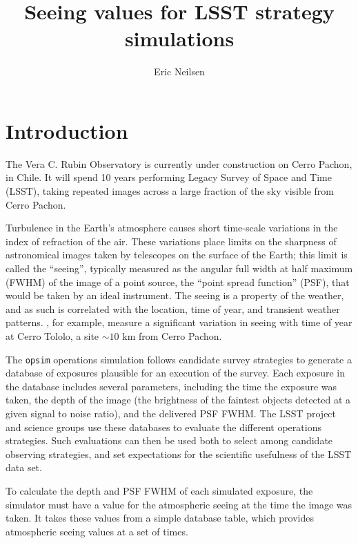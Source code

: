 \documentclass[DM,authoryear,toc]{lsstdoc}
\title{Seeing values for LSST strategy simulations}
\author{%
Eric Neilsen
}
\date{\vcsDate}
\begin{document}
\maketitle



\section{Introduction}
\label{sec:intro}

The Vera C. Rubin Observatory is currently under construction on Cerro
Pachon, in Chile. It will spend 10 years performing Legacy Survey of
Space and Time (LSST), taking repeated images across a large fraction
of the sky visible from Cerro Pachon.

Turbulence in the Earth's atmosphere causes short time-scale variations
in the index of refraction of the air. These variations place limits
on the sharpness of astronomical images taken by telescopes on the
surface of the Earth; this limit is called the ``seeing'', typically
measured as the angular full width at half maximum (FWHM) of the image
of a point source, the ``point spread function'' (PSF), that would be
taken by an ideal instrument. The seeing is a property of the weather,
and as such is correlated with the location, time of year, and
transient weather patterns. \cite{2009PASP..121..922E}, for example,
measure a significant variation in seeing with time of year at Cerro
Tololo, a site $\sim10 \mbox{ km}$ from Cerro Pachon.

The \texttt{opsim} operations simulation follows candidate survey
strategies to generate a database of exposures plausible for an
execution of the survey. Each exposure in the database includes
several parameters, including the time the exposure was taken, the
depth of the image (the brightness of the faintest objects detected at
a given signal to noise ratio), and the delivered PSF FWHM. The LSST
project and science groups use these databases to evaluate the
different operations strategies. Such evaluations can then be used
both to select among candidate observing strategies, and set
expectations for the scientific usefulness of the LSST data set.

To calculate the depth and PSF FWHM of each simulated exposure, the
simulator must have a value for the atmospheric seeing at the time the
image was taken. It takes these values from a simple database table, which
provides atmospheric seeing values at a set of times.
\end{document}
